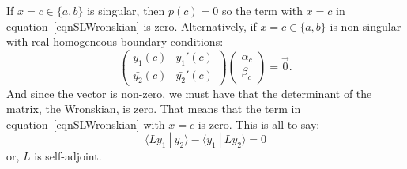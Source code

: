 \documentclass[../Main.tex]{subfiles}
\begin{document}
If $x = c \in \{a, b\}$ is singular, then $p(c) = 0$ so the term with $x = c$ in equation~\ref{eqnSLWronskian} is zero. Alternatively, if $x = c \in \{a, b\}$ is non-singular with real homogeneous boundary conditions:
\begin{equation*}
    \begin{pmatrix}
        y_1(c) & y_1'(c) \\
        \bar{y_2}(c) & \bar{y_2}'(c)
    \end{pmatrix}
    \begin{pmatrix} \alpha_c \\ \beta_c\end{pmatrix} = \vec{0}.
\end{equation*}
And since the vector is non-zero, we must have that the determinant of the matrix, the Wronskian, is zero. That means that the term in equation~\ref{eqnSLWronskian} with $x = c$ is zero. This is all to say:
\begin{equation}
    \langle Ly_1~|~y_2\rangle - \langle y_1~|~Ly_2\rangle = 0
    \label{eqnSLIsSelfAdj}
\end{equation}
or, $L$ is self-adjoint.
\end{document}
